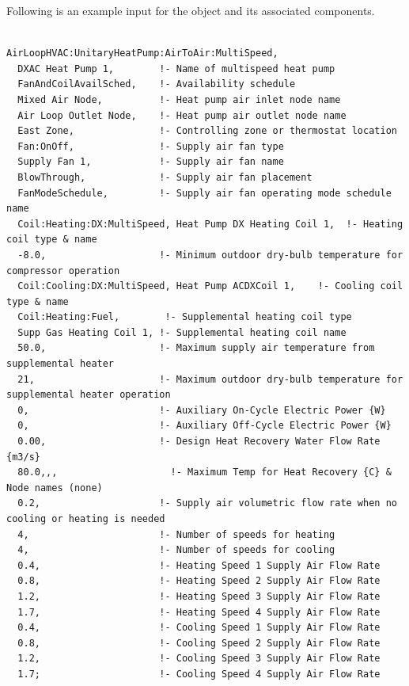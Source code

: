 Following is an example input for the object and its associated components.

\begin{lstlisting}

AirLoopHVAC:UnitaryHeatPump:AirToAir:MultiSpeed,
  DXAC Heat Pump 1,        !- Name of multispeed heat pump
  FanAndCoilAvailSched,    !- Availability schedule
  Mixed Air Node,          !- Heat pump air inlet node name
  Air Loop Outlet Node,    !- Heat pump air outlet node name
  East Zone,               !- Controlling zone or thermostat location
  Fan:OnOff,               !- Supply air fan type
  Supply Fan 1,            !- Supply air fan name
  BlowThrough,             !- Supply air fan placement
  FanModeSchedule,         !- Supply air fan operating mode schedule name
  Coil:Heating:DX:MultiSpeed, Heat Pump DX Heating Coil 1,  !- Heating coil type & name
  -8.0,                    !- Minimum outdoor dry-bulb temperature for compressor operation
  Coil:Cooling:DX:MultiSpeed, Heat Pump ACDXCoil 1,    !- Cooling coil type & name
  Coil:Heating:Fuel,        !- Supplemental heating coil type
  Supp Gas Heating Coil 1, !- Supplemental heating coil name
  50.0,                    !- Maximum supply air temperature from supplemental heater
  21,                      !- Maximum outdoor dry-bulb temperature for supplemental heater operation
  0,                       !- Auxiliary On-Cycle Electric Power {W}
  0,                       !- Auxiliary Off-Cycle Electric Power {W}
  0.00,                    !- Design Heat Recovery Water Flow Rate {m3/s}
  80.0,,,                    !- Maximum Temp for Heat Recovery {C} & Node names (none)
  0.2,                     !- Supply air volumetric flow rate when no cooling or heating is needed
  4,                       !- Number of speeds for heating
  4,                       !- Number of speeds for cooling
  0.4,                     !- Heating Speed 1 Supply Air Flow Rate
  0.8,                     !- Heating Speed 2 Supply Air Flow Rate
  1.2,                     !- Heating Speed 3 Supply Air Flow Rate
  1.7,                     !- Heating Speed 4 Supply Air Flow Rate
  0.4,                     !- Cooling Speed 1 Supply Air Flow Rate
  0.8,                     !- Cooling Speed 2 Supply Air Flow Rate
  1.2,                     !- Cooling Speed 3 Supply Air Flow Rate
  1.7;                     !- Cooling Speed 4 Supply Air Flow Rate


\end{lstlisting}
